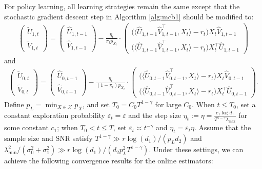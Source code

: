\documentclass[12pt]{article}
\newcommand{\inp}[2]{\langle #1,#2\rangle}
\def\hat{\widehat}
\def\tilde{\widetilde}
\theoremstyle{plain}
\begin{document}
For policy learning, all learning strategies remain the same except that the stochastic gradient descent step in Algorithm \ref{alg:mcb1} should be modified to:
\begin{align*}
        \begin{pmatrix}
            \tilde U_{1,t} \\
            \tilde V_{1,t}
        \end{pmatrix} = \begin{pmatrix}
            \hat U_{1,t-1} \\
            \hat V_{1,t-1} 
        \end{pmatrix} - \frac{\eta_t}{\pi_tp_{X_t}}\cdot\begin{pmatrix}
            \big(\inp{\hat U_{1,t-1}\hat V_{1,t-1}^{\top}}{X_t}-r_t\big)X_t\hat V_{1,t-1} \\
            \big(\inp{\hat U_{1,t-1}\hat V_{1,t-1}^{\top}}{X_t}-r_t)X_t^{\top}\hat U_{1,t-1}
        \end{pmatrix}
\end{align*}	
and
\begin{align*}
        \begin{pmatrix}
            \tilde U_{0,t} \\
            \tilde V_{0,t}
        \end{pmatrix} = \begin{pmatrix}
            \hat U_{0,t-1} \\
            \hat V_{0,t-1} 
        \end{pmatrix} - \frac{\eta_t}{(1-\pi_t)p_{X_t}}\cdot\begin{pmatrix}
            \big(\inp{\hat U_{0,t-1}\hat V_{0,t-1}^{\top}}{X_t}-r_t\big)X_t\hat V_{0,t-1} \\
            \big(\inp{\hat U_{0,t-1}\hat V_{0,t-1}^{\top}}{X_t}-r_t)X_t^{\top}\hat U_{0,t-1}
        \end{pmatrix}.
\end{align*}	
Define $p_{L}=\min_{X\in \mathcal{X}}p_{X}$, and set $T_0=C_0T^{1-\gamma}$ for large $C_0$. When $t\leq T_0$, set a constant exploration probability $\varepsilon_t=\varepsilon$ and the step size $\eta_t:=\eta=\frac{c_1\log d_1}{T^{1-\gamma}\lambda_{\max}}$ for some constant $c_1$; when $T_0<t\leq T$, set $\varepsilon_t\asymp t^{-\gamma}$ and $\eta_t=\varepsilon_t\eta$. Assume that the sample size and SNR satisfy $T^{1-\gamma}\gg r\log (d_1)/(p_Ld_2)$ and $\lambda_{\min}^2/(\sigma_0^2+\sigma_1^2)\gg r\log(d_1)/(d_2p_L^2T^{1-\gamma})$. Under these settings, we can achieve the following convergence results for the online estimators:
\end{document}
